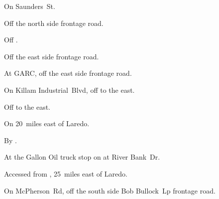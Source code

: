 
\begin{LocationList}

On  Saunders~St.

Off the north side  frontage road.

\Location{\GarageHQ \Garage}
Off .

Off the east side  frontage road.

At GARC, off the east side  frontage road.

On Killam Industrial~Blvd, off  to the east.

Off  to the east.

On  20~miles east of Laredo.

\Location{\RecruitmentAgency \Recruitment}
By .

At the Gallon Oil truck stop on  at River Bank~Dr.

Accessed from , 25~miles east of Laredo.

On McPherson~Rd, off the south side   Bob Bullock~Lp frontage road.

\end{LocationList}
